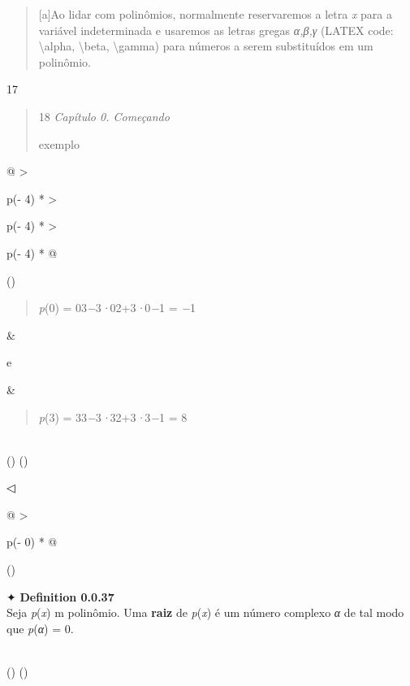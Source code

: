 \documentclass[
]{article}
\begin{document}
\begin{quote}
{[}a{]}Ao lidar com polinômios, normalmente reservaremos a letra
\emph{x} para a variável indeterminada e usaremos as letras gregas
\emph{α,β,γ} (LATEX code: \textbackslash alpha, \textbackslash beta,
\textbackslash gamma) para números a serem substituídos em um polinômio.
\end{quote}

17

\begin{quote}
18 \emph{Capítulo 0. Começando}

exemplo
\end{quote}

\begin{longtable}[]{@{}
  >{\raggedright\arraybackslash}p{(\columnwidth - 4\tabcolsep) * }
  >{\raggedright\arraybackslash}p{(\columnwidth - 4\tabcolsep) * }
  >{\raggedright\arraybackslash}p{(\columnwidth - 4\tabcolsep) * }@{}}
\toprule()
\begin{minipage}[b]{\linewidth}\raggedright
\begin{quote}
\emph{p}(0) = 03\emph{−}3\emph{·}02+3\emph{·}0\emph{−}1 = \emph{−}1
\end{quote}
\end{minipage} & \begin{minipage}[b]{\linewidth}\raggedright
e
\end{minipage} & \begin{minipage}[b]{\linewidth}\raggedright
\begin{quote}
\emph{p}(3) = 33\emph{−}3\emph{·}32+3\emph{·}3\emph{−}1 = 8
\end{quote}
\end{minipage} \\
\midrule()
\endhead
\bottomrule()
\end{longtable}

◁

\begin{longtable}[]{@{}
  >{\raggedright\arraybackslash}p{(\columnwidth - 0\tabcolsep) * }@{}}
\toprule()
\begin{minipage}[b]{\linewidth}\raggedright
✦ \textbf{Definition 0.0.37}\\
Seja \emph{p}(\emph{x}) m polinômio. Uma \textbf{raiz} de
\emph{p}(\emph{x}) é um número complexo \emph{α} de tal modo que
\emph{p}(\emph{α}) = 0.\strut
\end{minipage} \\
\midrule()
\endhead
\bottomrule()
\end{longtable}
\end{document}
